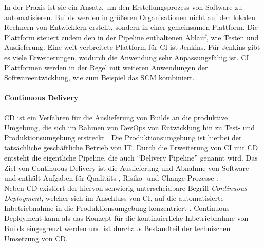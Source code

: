 In der Praxis ist sie ein Ansatz, um den Erstellungsprozess von Software zu automatisieren. Builds werden in größeren Organisationen nicht auf den lokalen Rechnern von Entwicklern erstellt, sondern in einer gemeinsamen Plattform. Die Plattform steuert zudem den in der Pipeline enthaltenen Ablauf, wie Testen und Auslieferung. Eine weit verbreitete Plattform für \ac{CI} ist Jenkins. Für Jenkins gibt es viele Erweiterungen, wodurch die Anwendung sehr Anpassungsfähig ist. 
\ac{CI} Plattformen werden in der Regel mit weiteren Anwendungen der Softwareentwicklung, wie zum Beispiel das \ac{SCM} kombiniert. 

\paragraph{Continuous Delivery}
\ac{CD} ist ein Verfahren für die Auslieferung von Builds an die produktive Umgebung, die sich im Rahmen von DevOps von Entwicklung hin zu Test- und Produktionsumgebung erstreckt \citet{Alt2017}. Die Produktionsumgebung ist hierbei der tatsächliche geschäftliche Betrieb von IT. Durch die Erweiterung von \ac{CI} mit \ac{CD} entsteht die eigentliche Pipeline, die auch \enquote{Delivery Pipeline} genannt wird. Das Ziel von Continuous Delivery ist die Auslieferung und Abnahme von Software und enthält Aufgaben für Qualitäts-, Risiko- und Change-Prozesse \cite{Alt2017}.
\medskip
\\
Neben \ac{CD} existiert der hiervon schwierig unterscheidbare Begriff \emph{Continuous Deployment}, welcher sich im Anschluss von \ac{CI}, auf die automatisierte Inbetriebnahme in die Produktionsumgebung konzentriert \cite{Alt2017}. Continuous Deployment kann als das Konzept für die kontinuierliche Inbetriebnahme von Builds eingegrenzt werden und ist durchaus Bestandteil der technischen Umsetzung von \ac{CD}.
%
